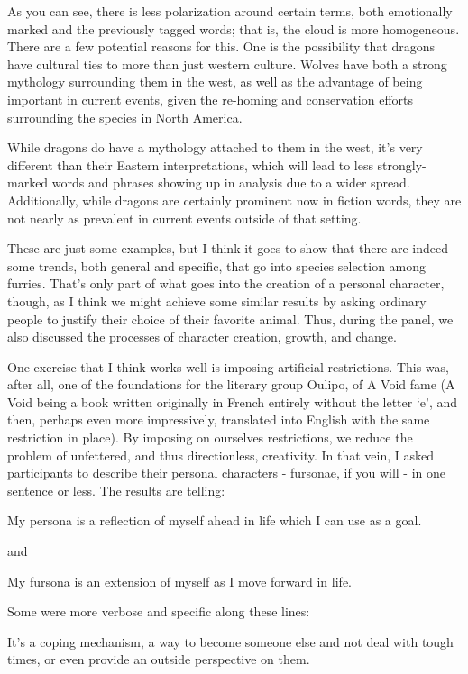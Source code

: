 As you can see, there is less polarization around certain terms, both emotionally marked and the previously tagged words; that is, the cloud is more homogeneous. There are a few potential reasons for this. One is the possibility that dragons have cultural ties to more than just western culture. Wolves have both a strong mythology surrounding them in the west, as well as the advantage of being important in current events, given the re-homing and conservation efforts surrounding the species in North America.

While dragons do have a mythology attached to them in the west, it's very different than their Eastern interpretations, which will lead to less strongly-marked words and phrases showing up in analysis due to a wider spread. Additionally, while dragons are certainly prominent now in fiction words, they are not nearly as prevalent in current events outside of that setting.

These are just some examples, but I think it goes to show that there are indeed some trends, both general and specific, that go into species selection among furries. That's only part of what goes into the creation of a personal character, though, as I think we might achieve some similar results by asking ordinary people to justify their choice of their favorite animal. Thus, during the panel, we also discussed the processes of character creation, growth, and change.

One exercise that I think works well is imposing artificial restrictions. This was, after all, one of the foundations for the literary group Oulipo, of A Void fame (A Void being a book written originally in French entirely without the letter `e', and then, perhaps even more impressively, translated into English with the same restriction in place). By imposing on ourselves restrictions, we reduce the problem of unfettered, and thus directionless, creativity. In that vein, I asked participants to describe their personal characters - fursonae, if you will - in one sentence or less. The results are telling:

My persona is a reflection of myself ahead in life which I can use as a goal.

and

My fursona is an extension of myself as I move forward in life.

Some were more verbose and specific along these lines:

It's a coping mechanism, a way to become someone else and not deal with tough times, or even provide an outside perspective on them.

